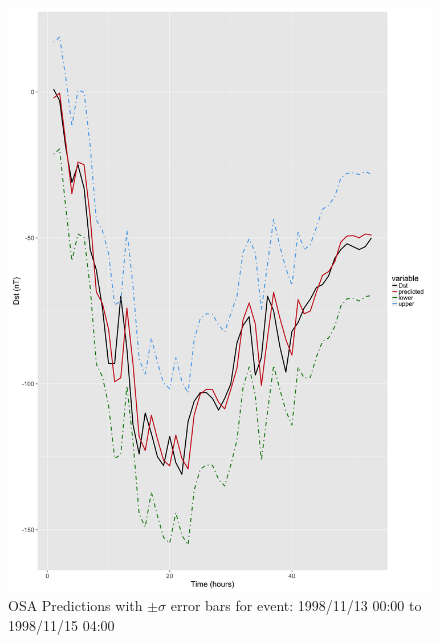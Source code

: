 \documentclass{article}
\begin{document}
\begin{figure}[h]
\includegraphics[width=\textwidth]{PredictionsModel1/PredErrBars_Storm8.png}
\caption{OSA Predictions with $\pm \sigma$ error bars for event: 1998/11/13 00:00 to 1998/11/15 04:00}
\label{fig:ComparePred2}
\end{figure}
\end{document}
